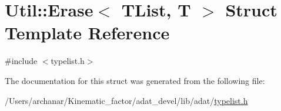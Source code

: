\hypertarget{structUtil_1_1TL_1_1Erase}{}\section{Util\+:\+:Erase$<$ T\+List, T $>$ Struct Template Reference}
\label{structUtil_1_1TL_1_1Erase}


{\ttfamily \#include $<$typelist.\+h$>$}



The documentation for this struct was generated from the following file\+:\begin{DoxyCompactItemize}
\item 
/\+Users/archanar/\+Kinematic\+\_\+factor/adat\+\_\+devel/lib/adat/\mbox{\hyperlink{lib_2adat_2typelist_8h}{typelist.\+h}}\end{DoxyCompactItemize}
